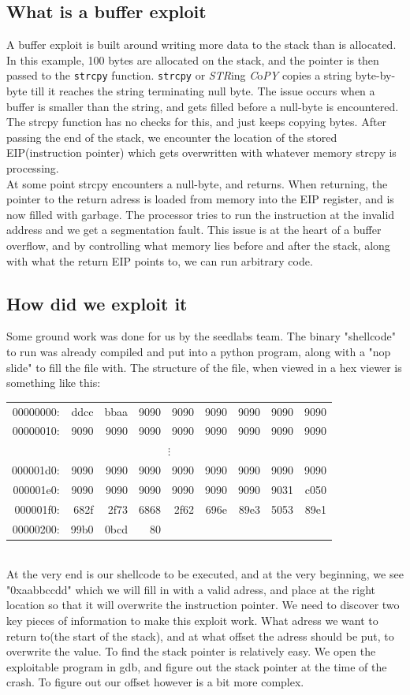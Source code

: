 \documentclass{article}
\begin{document}
\subsection{What is a buffer exploit}
A buffer exploit is built around writing more data to the stack than is allocated.
In this example, 100 bytes are allocated on the stack, and the pointer is then
passed to the \verb!strcpy! function. \verb!strcpy! or \emph{STR}ing 
\emph{C}o\emph{PY} copies a string byte-by-byte till it reaches the string terminating
null byte. The issue occurs when a buffer is smaller than the string, and gets filled
before a null-byte is encountered. The strcpy function has no checks for this, and
just keeps copying bytes. After passing the end of the stack, we encounter the location
of the stored EIP(instruction pointer) which gets overwritten with whatever memory
strcpy is processing.\\
At some point strcpy encounters a null-byte, and returns. When returning, the pointer
to the return adress is loaded from memory into the EIP register, and is now filled
with garbage. The processor tries to run the instruction at the invalid address and
we get a segmentation fault. This issue is at the heart of a buffer overflow, and
by controlling what memory lies before and after the stack, along with what the return
EIP points to, we can run arbitrary code.

\subsection{How did we exploit it}
Some ground work was done for us by the seedlabs team. The binary "shellcode" to run
was already compiled and put into a python program, along with a "nop slide" to fill
the file with. The structure of the file, when viewed in a hex viewer is something
like this:\\
\begin{tabular}{r r r r r r r r r}
00000000:&ddcc&bbaa&9090&9090&9090&9090&9090&9090\\
00000010:&9090&9090&9090&9090&9090&9090&9090&9090\\
\multicolumn{9}{c}{$\vdots$}\\
000001d0:&9090&9090&9090&9090&9090&9090&9090&9090\\
000001e0:&9090&9090&9090&9090&9090&9090&9031&c050\\
000001f0:&682f&2f73&6868&2f62&696e&89e3&5053&89e1\\
00000200:&99b0&0bcd&80&&&&&
\end{tabular}\\
At the very end is our shellcode to be executed, and at the very beginning, we see
"0xaabbccdd" which we will fill in with a valid adress, and place at the right location
so that it will overwrite the instruction pointer. We need to discover two key pieces
of information to make this exploit work. What adress we want to return to(the start
of the stack), and at what offset the adress should be put, to overwrite the value.
To find the stack pointer is relatively easy. We open the exploitable program in gdb,
and figure out the stack pointer at the time of the crash. To figure out our offset
however is a bit more complex.\\
\end{document}
